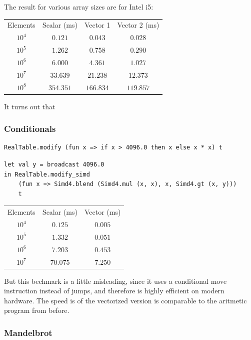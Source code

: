 \documentclass{article}
\begin{document}
The result for various array sizes are for Intel i5:
\begin{center}
\begin{tabular}{ c c c c }
    Elements & Scalar (ms) & Vector 1 & Vector 2 (ms) \\
    $10^4$ & $0.121$ & $0.043$ & $0.028$ \\
    $10^5$ & $1.262$ & $0.758$ & $0.290$ \\
    $10^6$ & $6.000$ & $4.361$ & $1.027$ \\
    $10^7$ & $33.639$ & $21.238$ & $12.373$ \\
    $10^8$ & $354.351$ & $166.834$ & $119.857$ \\
\end{tabular}
\end{center}

It turns out that 
\subsubsection{Conditionals}

\begin{lstlisting}
RealTable.modify (fun x => if x > 4096.0 then x else x * x) t
\end{lstlisting}

\begin{lstlisting}
let val y = broadcast 4096.0
in RealTable.modify_simd
    (fun x => Simd4.blend (Simd4.mul (x, x), x, Simd4.gt (x, y)))
    t
\end{lstlisting}

\begin{center}
\begin{tabular}{ c c c }
    Elements & Scalar (ms) & Vector (ms) \\
    $10^4$ & $0.125$ & $0.005$ \\
    $10^5$ & $1.332$ & $0.051$ \\
    $10^6$ & $7.203$ & $0.453$ \\
    $10^7$ & $70.075$ & $7.250$
\end{tabular}
\end{center}

But this bechmark is a little misleading, since it uses a conditional move instruction instead of jumps, and therefore is highly efficient on modern hardware. The speed is of the vectorized version is comparable to the aritmetic program from before.

\subsubsection{Mandelbrot}
\end{document}
